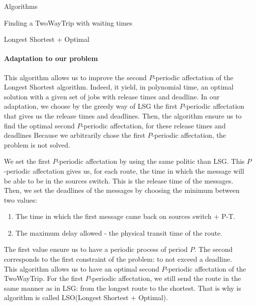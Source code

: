 \documentclass[a4paper,10pt]{report}
\begin{document}
\begin{chapter}{Algorithms}
\begin{section}{Finding a TwoWayTrip with waiting times}
\begin{subsection}{Longest Shortest + Optimal}
\paragraph{Adaptation to our problem}
This algorithm allows us to improve the second $P$-periodic affectation of the Longest Shortest algorithm. 
Indeed, it yield, in polynomial time, an optimal solution with a given set of jobs with release times and deadline. 
In our adaptation, we choose by the greedy way of LSG the first $P$-periodic affectation that gives us the release times and deadlines. Then, the algorithm ensure us to find the optimal second $P$-periodic affectation, for these release times and deadlines
Because we arbitrarily chose the first $P$-periodic affectation, the problem is not solved.

We set the first $P$-periodic affectation by using the same politic than LSG. This $P$-periodic affectation gives us, for each route, the time in which the message will be able to be in the sources switch. This is the release time of the messages. Then, we set the deadlines of the messages by choosing the minimum between two values: 
\begin{enumerate}
 \item The time in which the first message came back on sources switch + P-T.
 \item The maximum delay allowed - the physical transit time of the route.
\end{enumerate}

The first value ensure us to have a periodic process of period $P$. The second corresponds to the first constraint of the problem: to not exceed a deadline.\\
This algorithm allows us to have an optimal second $P$-periodic affectation of the TwoWayTrip. For the first $P$-periodic affectation, we still send the route in the same manner as in LSG: from the longest route to the shortest. That is why is algorithm is called LSO(Longest Shortest + Optimal).


\end{subsection}

\end{section}

\end{chapter}
\end{document}

